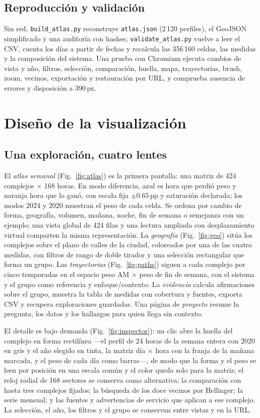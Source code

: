 \IfFileExists{IEEEtran.cls}{\documentclass[conference]{IEEEtran}}{\documentclass[10pt,twocolumn]{article}}
\begin{document}
\subsection{Reproducción y validación}

Sin red, \texttt{build\_atlas.py} reconstruye \texttt{atlas.json} (2\,120 perfiles), el GeoJSON simplificado y una auditoría con hashes; \texttt{validate\_atlas.py} vuelve a leer el CSV, cuenta los días a partir de fechas y recalcula las 356\,160 celdas, las medidas y la composición del sistema. Una prueba con Chromium ejecuta cambios de vista y año, filtros, selección, comparación, huella, mapa, trayectorias, brush, zoom, vecinos, exportación y restauración por URL, y comprueba ausencia de errores y disposición a 390\,px.

\section{Diseño de la visualización}

\subsection{Una exploración, cuatro lentes}

El \emph{atlas semanal} (Fig.~\ref{fig:atlas}) es la primera pantalla: una matriz de 424 complejos $\times$ 168 horas. En modo diferencia, azul es hora que perdió peso y naranja hora que lo ganó, con escala fija $\pm0.65$\,pp y saturación declarada; los modos 2024 y 2020 muestran el peso de cada celda. Se ordena por cambio de forma, geografía, volumen, mañana, noche, fin de semana o semejanza con un ejemplo; una vista global de 424 filas y una lectura ampliada con desplazamiento virtual comparten la misma representación. La \emph{geografía} (Fig.~\ref{fig:geo}) sitúa los complejos sobre el plano de calles de la ciudad, coloreados por una de las cuatro medidas, con filtros de rango de doble tirador y una selección rectangular que forma un grupo. Las \emph{trayectorias} (Fig.~\ref{fig:paths}) siguen a cada complejo por cinco temporadas en el espacio peso AM $\times$ peso de fin de semana, con el sistema y el grupo como referencia y enfoque/contexto. La \emph{evidencia} calcula afirmaciones sobre el grupo, muestra la tabla de medidas con cobertura y fuentes, exporta CSV y recupera exploraciones guardadas. Una página de \emph{proyecto} resume la pregunta, los datos y los hallazgos para quien llega sin contexto.

El detalle es bajo demanda (Fig.~\ref{fig:inspector}): un clic abre la huella del complejo en forma rectilínea ---el perfil de 24 horas de la semana entera con 2020 en gris y el año elegido en tinta, la matriz día $\times$ hora con la franja de la mañana marcada, y el peso de cada día como barras---, de modo que la forma y el peso se leen por posición en una escala común y el color queda solo para la matriz; el reloj radial de 168 sectores se conserva como alternativa; la comparación con hasta tres complejos fijados; la búsqueda de los doce vecinos por Hellinger; la serie mensual; y las fuentes y advertencias de servicio que aplican a ese complejo. La selección, el año, los filtros y el grupo se conservan entre vistas y en la URL.
\end{document}
